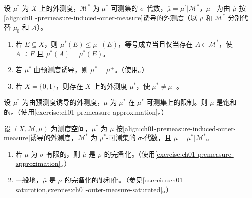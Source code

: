 \documentclass[../../main.tex]{subfiles}%
\begin{document}
\begin{exercise}\label{exercise:ch01-induced-outer-measure-idempotence}
设 $\mu^*$ 为 $X$ 上的外测度，$\mathscr{M}^*$ 为 $\mu^*$-可测集的 $\sigma$-代数，$\overline{\mu}=\mu^*|\mathscr{M}^*$，$\mu^+$ 为由 $\overline{\mu}$ 按\eqref{align:ch01-premeasure-induced-outer-measure}诱导的外测度（以 $\overline{\mu}$ 和 $\mathscr{M}^*$ 分别代替 $\mu_0$ 和 $\mathscr{A}$）。
\begin{enumerate}[label=\alph*.,ref=(\alph*)]
\item\label{item:ch01-induced-outer-measure-hull} 若 $E\subseteq X$，则 $\mu^*(E)\leqslant\mu^+(E)$，等号成立当且仅当存在 $A\in\mathscr{M}^*$，使 $A\supseteq E$ 且 $\mu^*(A)=\mu^*(E)$。
\item\label{item:ch01-induced-outer-measure-from-premeasure} 若 $\mu^*$ 由预测度诱导，则 $\mu^*=\mu^+$。（使用。）
\item\label{item:ch01-induced-outer-measure-counterexample} 若 $X=\{0,1\}$，则存在 $X$ 上的外测度 $\mu^*$，使 $\mu^*\ne\mu^+$。
\end{enumerate}
\end{exercise}

\begin{exercise}\label{exercise:ch01-outer-measure-saturated}
设 $\mu^*$ 为由预测度诱导的外测度，$\overline{\mu}$ 为 $\mu^*$ 在 $\mu^*$-可测集上的限制。则 $\overline{\mu}$ 是饱和的。（使用\cref{exercise:ch01-premeasure-approximation}。）
\end{exercise}

\begin{exercise}\label{exercise:ch01-extension-completion-saturation}
设 $(X,\mathscr{M},\mu)$ 为测度空间，$\mu^*$ 为 $\mu$ 按\eqref{align:ch01-premeasure-induced-outer-measure}诱导的外测度，$\mathscr{M}^*$ 为 $\mu^*$-可测集的 $\sigma$-代数，且 $\overline{\mu}=\mu^*|\mathscr{M}^*$。
\begin{enumerate}[label=\alph*.,ref=(\alph*)]
\item\label{item:ch01-extension-completion-sigma-finite} 若 $\mu$ 为 $\sigma$-有限的，则 $\overline{\mu}$ 是 $\mu$ 的完备化。（使用\cref{exercise:ch01-premeasure-approximation}。）
\item\label{item:ch01-extension-completion-general} 一般地，$\overline{\mu}$ 是 $\mu$ 的完备化的饱和化。（参见\cref{exercise:ch01-saturation,exercise:ch01-outer-measure-saturated}。）
\end{enumerate}
\end{exercise}
\end{document}
